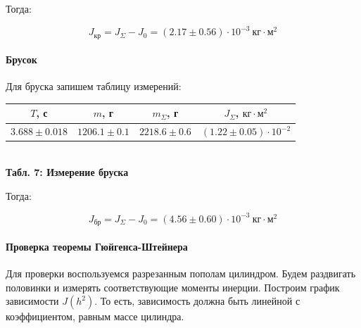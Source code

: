 \documentclass[12pt,a4paper]{scrartcl}
\begin{document}
	Тогда:
	
	$$J_{\text{кр}} = J_\Sigma - J_0 = (2.17 \pm 0.56) \cdot 10^{-3}\ \text{кг}\cdot\text{м}^2$$
	
	\paragraph{Брусок} \hfill
	
	Для бруска запишем таблицу измерений:
	
	\begin{center}
		\begin{tabular}{|c|c|c|c|}
			\hline
			$T$, с & $m$, г & $m_{\Sigma}$, г & $J_\Sigma$, $\text{кг}\cdot\text{м}^2$
			\\\hline
			$3.688 \pm 0.018$ & $1206.1 \pm 0.1$ & $2218.6 \pm 0.6$ & $(1.22 \pm 0.05) \cdot 10^{-2}$
			\\\hline
		\end{tabular}
		\\\textbf{Табл. 7: Измерение бруска}
	\end{center}
	
	Тогда:
	
	$$J_{\text{бр}} = J_\Sigma - J_0 = (4.56 \pm 0.60) \cdot 10^{-3}\ \text{кг}\cdot\text{м}^2$$
	
	\paragraph{Проверка теоремы Гюйгенса-Штейнера} \hfill
	
	Для проверки воспользуемся разрезанным пополам цилиндром. Будем раздвигать половинки и измерять соответствующие моменты инерции. Построим график зависимости $J(h^2)$. То есть, зависимость должна быть линейной с коэффициентом, равным массе цилиндра.
	
\end{document}
